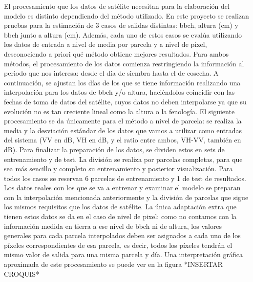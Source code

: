 \par  El procesamiento que los datos de satélite necesitan para la elaboración del modelo es distinto dependiendo del método utilizado. En este proyecto se realizan pruebas para la estimación de 3 casos de salidas distintas: \gls{bbch}, altura (cm) y \gls{bbch} junto a altura (cm). Además, cada uno de estos casos se evalúa utilizando los datos de entrada a nivel de media por parcela y a nivel de pixel, desconociendo a priori qué método obtiene mejores resultados. Para ambos métodos, el procesamiento de los datos comienza restringiendo la información al periodo que nos interesa: desde el día de siembra hasta el de cosecha. A continuación, se ajustan los días de los que se tiene información realizando una interpolación para los datos de \gls{bbch} y/o altura, haciéndolos coincidir con las fechas de toma de datos del satélite, cuyos datos no deben interpolarse ya que su evolución no es tan creciente lineal como la altura o la fenología. El siguiente procesamiento se da únicamente para el método a nivel de parcela: se realiza la media y la desviación estándar de los datos que vamos a utilizar como entradas del sistema (VV en dB, VH en dB, y el ratio entre ambos, VH-VV, también en dB). Para finalizar la preparación de los datos, se dividen estos en sets de entrenamiento y de test. La división se realiza por parcelas completas, para que sea más sencillo y completo su entrenamiento y posterior visualización. Para todos los casos se reservan 6 parcelas de entrenamiento y 1 de test de resultados. Los datos reales con los que se va a entrenar y examinar el modelo se preparan con la interpolación mencionada anteriormente y la división de parcelas que sigue los mismos requisitos que los datos de satélite. La única adaptación extra que tienen estos datos se da en el caso de nivel de pixel: como no contamos con la información medida en tierra a ese nivel de \gls{bbch} ni de altura, los valores generales para cada parcela interpolados deben ser asignados a cada uno de los píxeles correspondientes de esa parcela, es decir, todos los píxeles tendrán el mismo valor de salida para una misma parcela y día. Una interpretación gráfica aproximada de este procesamiento se puede ver en la figura *INSERTAR CROQUIS*